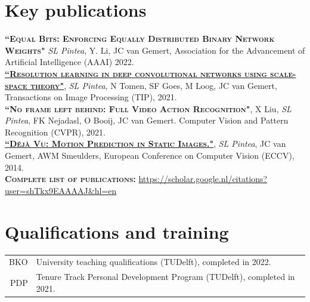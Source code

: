 \documentclass[a4paper, oneside, final]{scrartcl}
\begin{document}
\begin{center}
		\section{Key publications}
        \begin{flushleft}
            \textsc{\textbf{``Equal Bits: Enforcing Equally Distributed Binary Network Weights"}} \emph{SL Pintea}, Y. Li, JC van Gemert, Association for the Advancement of Artificial Intelligence (AAAI) 2022.\\[3px]

            \textsc{\textbf{\href{https://github.com/SilviaLauraPintea/N-JetNet}{``Resolution learning in deep convolutional networks using scale-space theory"}}}, \emph{SL Pintea}, N Tomen, SF Goes, M Loog, JC van Gemert, Transactions on Image Processing (TIP), 2021.\\[3px]
			\textsc{\textbf{``No frame left behind: Full Video Action Recognition"}}, X Liu, \emph{SL Pintea}, FK Nejadasl, O Booij, JC van Gemert. 
            Computer Vision and Pattern Recognition (CVPR), 2021.\\[3px]
            \textsc{\textbf{\href{http://github.com/SilviaLauraPintea/DejaVu}{``D\'{e}j\`{a} Vu: Motion Prediction in Static Images."}}}, \emph{SL Pintea}, JC van Gemert, AWM Smeulders, 
            European Conference on Computer Vision (ECCV), 2014.\\[10px]
            \textsc{\textbf{Complete list of publications:}} \href{https://scholar.google.nl/citations?user=shTkx9EAAAAJ&hl=en}{https://scholar.google.nl/citations?user=shTkx9EAAAAJ\&hl=en}\\
        \end{flushleft}
		\section{Qualifications and training}
		\begin{tabular}{r@{\hskip 0.3in}p{12.3cm}}
            \textsc{BKO}                   & University teaching qualifications (TUDelft), completed in 2022.\\
            \textsc{PDP}                   & Tenure Track Personal Development Program (TUDelft), completed in 2021.\\
		\end{tabular}

\end{center}
\end{document}
